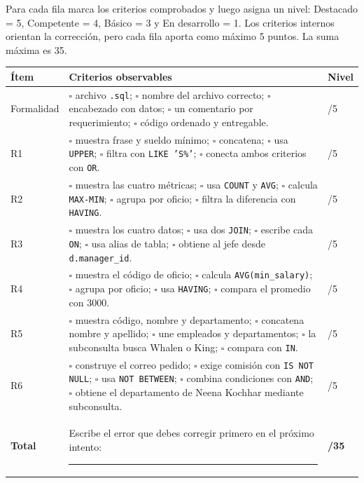 \documentclass[11pt,a4paper]{article}
\newcommand{\campo}[1]{\texttt{#1}}
\newcommand{\casilla}{\(\square\)}
\begin{document}
Para cada fila marca los criterios comprobados y luego asigna un nivel: Destacado = 5,
Competente = 4, Básico = 3 y En desarrollo = 1. Los criterios internos orientan la corrección, pero
cada fila aporta como máximo 5 puntos. La suma máxima es 35.

\begin{longtable}{p{} p{} p{}}
\toprule
\textbf{Ítem} & \textbf{Criterios observables} & \textbf{Nivel} \\
\midrule
\endhead
Formalidad & \casilla{} archivo \campo{.sql}; \casilla{} nombre del archivo correcto;
\casilla{} encabezado con datos; \casilla{} un comentario por requerimiento; \casilla{} código
ordenado y entregable. & /5 \\
R1 & \casilla{} muestra frase y sueldo mínimo; \casilla{} concatena; \casilla{} usa
\campo{UPPER}; \casilla{} filtra con \campo{LIKE 'S\%'}; \casilla{} conecta ambos criterios con
\campo{OR}. & /5 \\
R2 & \casilla{} muestra las cuatro métricas; \casilla{} usa \campo{COUNT} y \campo{AVG};
\casilla{} calcula \campo{MAX-MIN}; \casilla{} agrupa por oficio; \casilla{} filtra la diferencia
con \campo{HAVING}. & /5 \\
R3 & \casilla{} muestra los cuatro datos; \casilla{} usa dos \campo{JOIN}; \casilla{} escribe cada
\campo{ON}; \casilla{} usa alias de tabla; \casilla{} obtiene al jefe desde
\campo{d.manager\_id}. & /5 \\
R4 & \casilla{} muestra el código de oficio; \casilla{} calcula \campo{AVG(min\_salary)};
\casilla{} agrupa por oficio; \casilla{} usa \campo{HAVING}; \casilla{} compara el promedio con
3000. & /5 \\
R5 & \casilla{} muestra código, nombre y departamento; \casilla{} concatena nombre y apellido;
\casilla{} une empleados y departamentos; \casilla{} la subconsulta busca Whalen o King;
\casilla{} compara con \campo{IN}. & /5 \\
R6 & \casilla{} construye el correo pedido; \casilla{} exige comisión con \campo{IS NOT NULL};
\casilla{} usa \campo{NOT BETWEEN}; \casilla{} combina condiciones con \campo{AND};
\casilla{} obtiene el departamento de Neena Kochhar mediante subconsulta. & /5 \\
\midrule
\textbf{Total} & Escribe el error que debes corregir primero en el próximo intento:
\rule{7cm}{0.4pt} & \textbf{/35} \\
\bottomrule
\end{longtable}
\end{document}
